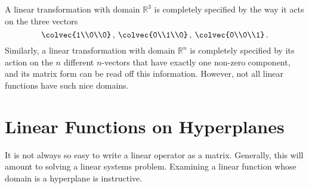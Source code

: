 A linear transformation with domain $\mathbb{R}^3$ is completely specified by the way it acts on the three vectors 
\[
\colvec{1\\0\\0}\, ,\:\colvec{0\\1\\0}\, ,\:\colvec{0\\0\\1}\, .
\]
Similarly, a linear transformation with domain $\mathbb{R}^n$ is completely specified by its action on the $n$ different $n$-vectors that have exactly one non-zero component, and its matrix form can be read off this information. However, not all linear functions have such nice domains.



\section{Linear Functions on Hyperplanes }
It is not always so easy to write a linear operator as a matrix. 
Generally, this will amount to solving a linear systems problem. Examining a linear function whose domain is a hyperplane is instructive.

